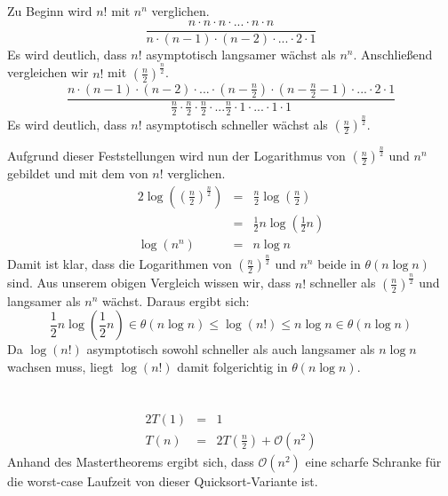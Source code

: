 \documentclass[10pt,a4paper,oneside,ngerman,numbers=noenddot]{scrartcl}
\begin{document}
\section{} %
	Zu Beginn wird $n!$ mit $n^{n}$ verglichen.
	\[
		\frac{n \cdot n \cdot n \cdot \text{...} \cdot n \cdot n}{n \cdot (n-1) \cdot (n-2) \cdot \text{...} \cdot 2 \cdot 1}
	\]
	Es wird deutlich, dass $n!$ asymptotisch langsamer wächst als $n^{n}$. Anschließend vergleichen wir $n!$ mit $\left(\frac{n}{2}\right)^{\frac{n}{2}}$.
	\[
		\frac{n \cdot (n-1) \cdot (n-2) \cdot ... \cdot (n- \frac{n}{2}) \cdot (n - \frac{n}{2} - 1) \cdot ... \cdot 2 \cdot 1}{\frac{n}{2} \cdot \frac{n}{2} \cdot \frac{n}{2} \cdot ... \frac{n}{2} \cdot 1 \cdot ... \cdot 1 \cdot 1}
	\]
	Es wird deutlich, dass $n!$ asymptotisch schneller wächst als $\left(\frac{n}{2}\right)^{\frac{n}{2}}$.
	
	Aufgrund dieser Feststellungen wird nun der Logarithmus von $\left(\frac{n}{2}\right)^{\frac{n}{2}}$ und $n^{n}$ gebildet und mit dem von $n!$ verglichen.
	\begin{alignat*}{2}
		\log\left(\left(\frac{n}{2}\right)^{\frac{n}{2}}\right) &=& \frac{n}{2} \log\left(\frac{n}{2}\right) \\
		&=& \frac{1}{2}n \log\left(\frac{1}{2}n\right) \\
		\log(n^{n}) &=& n \log n
	\end{alignat*}
	Damit ist klar, dass die Logarithmen von $\left(\frac{n}{2}\right)^{\frac{n}{2}}$ und $n^{n}$ beide in $\theta(n \log n)$ sind. Aus unserem obigen Vergleich wissen wir, dass $n!$ schneller als $\left(\frac{n}{2}\right)^{\frac{n}{2}}$ und langsamer als $n^{n}$ wächst. Daraus ergibt sich:
	\[
		\frac{1}{2}n\log(\frac{1}{2}n) \in \theta(n \log n) \leq \log(n!) \leq n \log n \in \theta(n \log n)
	\]
	Da $\log(n!)$ asymptotisch sowohl schneller als auch langsamer als $n \log n$ wachsen muss, liegt $\log(n!)$ damit folgerichtig in $\theta(n \log n)$.
\section{} %
	\subsection{} %
		\begin{alignat*}{2}
			T(1) &=& 1 \\
			T(n) &=& 2T\left(\frac{n}{2}\right) + \mathcal{O}(n^{2})
		\end{alignat*}
		Anhand des Mastertheorems ergibt sich, dass $\mathcal{O}(n^{2})$ eine scharfe Schranke für die worst-case Laufzeit von dieser Quicksort-Variante ist.
\end{document}
